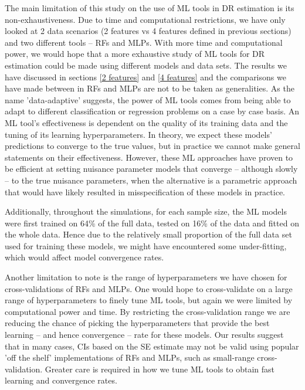 \documentclass[12pt,twoside]{article}
\begin{document}
The main limitation of this study on the use of ML tools in DR estimation is its non-exhaustiveness. Due to time and computational restrictions, we have only looked at 2 data scenarios (2 features vs 4 features defined in previous sections) and two different tools -- RFs and MLPs. With more time and computational power, we would hope that a more exhaustive study of ML tools for DR estimation could be made using different models and data sets. The results we have discussed in sections \ref{2 features} and \ref{4 features} and the comparisons we have made between in RFs and MLPs are not to be taken as generalities. As the name 'data-adaptive' suggests, the power of ML tools comes from being able to adapt to different classification or regression problems on a case by case basis. An ML tool's effectiveness is dependent on the quality of its training data and the tuning of its learning hyperparameters. In theory, we expect these models' predictions to converge to the true values, but in practice we cannot make general statements on their effectiveness. However, these ML approaches have proven to be efficient at setting nuisance parameter models that converge -- although slowly -- to the true nuisance parameters, when the alternative is a parametric approach that would have likely resulted in misspecification of these models in practice. 

Additionally, throughout the simulations, for each sample size, the ML models were first trained on 64\% of the full data, tested on 16\% of the data and fitted on the whole data. Hence due to the relatively small proportion of the full data set used for training these models, we might have encountered some under-fitting, which would affect model convergence rates.

Another limitation to note is the range of hyperparameters we have chosen for cross-validations of RFs and MLPs. One would hope to cross-validate on a large range of hyperparameters to finely tune ML tools, but again we were limited by computational power and time. By restricting the cross-validation range we are reducing the chance of picking the hyperparameters that provide the best learning -- and hence convergence -- rate for these models. Our results suggest that in many cases, CIs based on the \cite{lunceford_davidian} SE estimate may not be valid using popular 'off the shelf' implementations of RFs and MLPs, such as small-range cross-validation. Greater care is required in how we tune ML tools to obtain fast learning and convergence rates.
\end{document}
